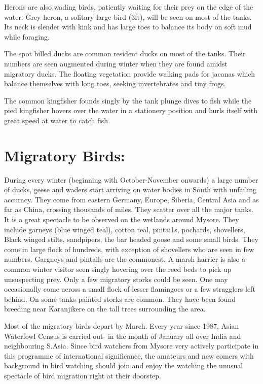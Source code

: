 Herons are also wading birds, patiently waiting for 
their prey on the edge of the water. Grey heron, a 
solitary large bird (3ft), will be seen on most of the tanks. 
Its neck is slender with kink and has large toes to balance 
its body on soft mud while foraging. 

The spot billed ducks are common resident ducks on most 
of the tanks. Their numbers are seen augmented during winter 
when they are found amidst migratory ducks. The floating 
vegetation provide walking pads for jacanas which balance 
themselves with long toes, seeking invertebrates and tiny 
frogs. 

The common kingfisher founds singly by the tank plunge 
dives to fish while the pied kingfisher hovers over the water 
in a stationery position and hurls itself with great speed at 
water to catch fish. 

\section*{Migratory Birds:} 

During every winter (beginning with October-November 
onwards) a large number of ducks, geese and waders start 
arriving on water bodies in South with unfailing accuracy. 
They come from eastern Germany, Europe, Siberia, Central Asia 
and as far as China, crossing thousands of miles. They 
scatter over all the major tanks. It is a great spectacle to 
be observed on the wetlands around Mysore. They include 
garneys (blue winged teal), cotton teal, pintai1s, 
pochards, shovellers, Black winged stilts, sandpipers, the 
bar headed goose and some small birds. They come in large 
flock of hundreds, with exception of shovellers who are seen 
in few numbers. Gargneys and pintails are the commonest. A 
marsh harrier is also a common winter visitor seen singly 
hovering over the reed beds to pick up unsuspecting prey. Only 
a few migratory storks could be seen. One may occasionally 
come across a small flock of lesser flamingoes  or a few 
stragglers left behind. On some tanks painted storks are 
common. They have been found breeding near Karanjikere on the tall 
trees surrounding the area. 

Most of the migratory birds depart by March. Every year
since 1987, Asian Waterfowl Census is carried out- in the 
month of January all over India and neighbouring S.Asia. 
Since bird watchers from Mysore very actively participate in 
this programme of international significance, the amateurs 
and new comers with background in bird watching should join 
and enjoy the watching the unusual spectacle of bird 
migration right at their doorstep. 

